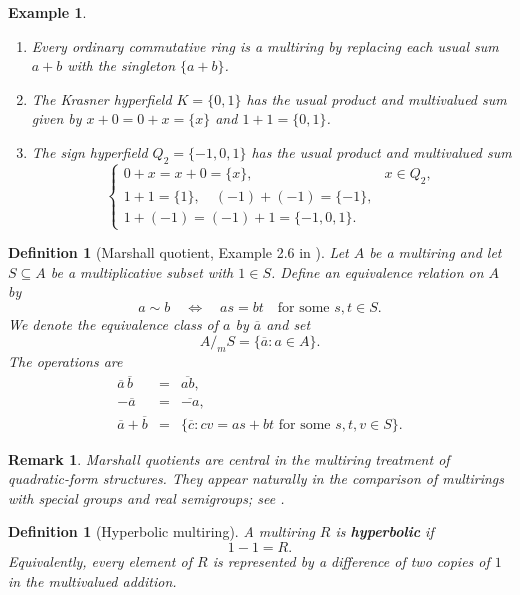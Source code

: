 \documentclass[a4paper,10pt]{article}
\newtheorem{defn}[teo]{Definition}
\newtheorem{ex}[teo]{Example}
\newtheorem{rem}[teo]{Remark}
\begin{document}
\begin{ex}\label{ex:basic-examples}
$ $
\begin{enumerate}[a -]
    \item Every ordinary commutative ring is a multiring by replacing each usual sum $a+b$ with the singleton $\{a+b\}$.
    \item The Krasner hyperfield $K=\{0,1\}$ has the usual product and multivalued sum given by $x+0=0+x=\{x\}$ and $1+1=\{0,1\}$.
    \item The sign hyperfield $Q_2=\{-1,0,1\}$ has the usual product and multivalued sum
    \[
    \begin{cases}
        0+x=x+0=\{x\}, & x\in Q_2,\\
        1+1=\{1\},\quad (-1)+(-1)=\{-1\},\\
        1+(-1)=(-1)+1=\{-1,0,1\}.
    \end{cases}
    \]
\end{enumerate}
\end{ex}

\begin{defn}[Marshall quotient, Example 2.6 in \cite{marshall2006real}]\label{defn:strangeloc}
Let $A$ be a multiring and let $S\subseteq A$ be a multiplicative subset with $1\in S$.  Define an equivalence relation on $A$ by
\[
        a\sim b \quad\Longleftrightarrow\quad as=bt
        \quad\mbox{for some }s,t\in S.
\]
We denote the equivalence class of $a$ by $\overline a$ and set
\[
        A/_mS=\{\overline a:a\in A\}.
\]
The operations are
\[
\begin{array}{rcl}
\overline a\,\overline b&=&\overline{ab},\\[2mm]
-\overline a&=&\overline{-a},\\[2mm]
\overline a+\overline b&=&\{\overline c:cv=as+bt\mbox{ for some }s,t,v\in S\}.
\end{array}
\]
\end{defn}

\begin{rem}
Marshall quotients are central in the multiring treatment of quadratic-form structures.  They appear naturally in the comparison of multirings with special groups and real semigroups; see \cite{ribeiro2016functorial,roberto2021quadratic,roberto2021ktheory}.
\end{rem}

\begin{defn}[Hyperbolic multiring]\label{defn:hyperbolic}
A multiring $R$ is \textbf{hyperbolic} if
\[
        1-1=R.
\]
Equivalently, every element of $R$ is represented by a difference of two copies of $1$ in the multivalued addition.
\end{defn}
\end{document}
